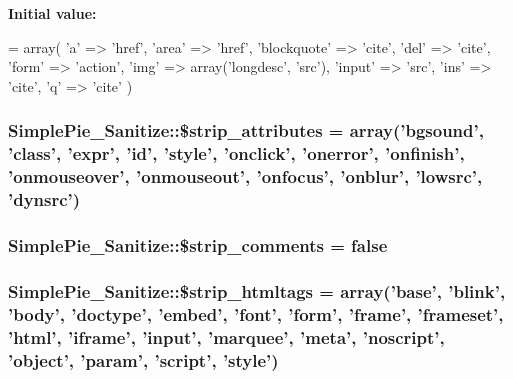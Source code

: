 {\bfseries Initial value\-:}
\begin{DoxyCode}
= array(
        \textcolor{charliteral}{'a'} => \textcolor{stringliteral}{'href'},
        \textcolor{stringliteral}{'area'} => \textcolor{stringliteral}{'href'},
        \textcolor{stringliteral}{'blockquote'} => \textcolor{stringliteral}{'cite'},
        \textcolor{stringliteral}{'del'} => \textcolor{stringliteral}{'cite'},
        \textcolor{stringliteral}{'form'} => \textcolor{stringliteral}{'action'},
        \textcolor{stringliteral}{'img'} => array(\textcolor{stringliteral}{'longdesc'}, \textcolor{stringliteral}{'src'}),
        \textcolor{stringliteral}{'input'} => \textcolor{stringliteral}{'src'},
        \textcolor{stringliteral}{'ins'} => \textcolor{stringliteral}{'cite'},
        \textcolor{charliteral}{'q'} => \textcolor{stringliteral}{'cite'}
    )
\end{DoxyCode}
\hypertarget{class_simple_pie___sanitize_aae7867d2da9eb4e606825088dafa74c3}{
\subsubsection[{\$strip\-\_\-attributes}]{\setlength{\rightskip}{0pt plus 5cm}Simple\-Pie\-\_\-\-Sanitize\-::\$strip\-\_\-attributes = array('bgsound', 'class', 'expr', 'id', 'style', 'onclick', 'onerror', 'onfinish', 'onmouseover', 'onmouseout', 'onfocus', 'onblur', 'lowsrc', 'dynsrc')}}\label{class_simple_pie___sanitize_aae7867d2da9eb4e606825088dafa74c3}
\hypertarget{class_simple_pie___sanitize_a08b78049d62d7787d48a648c778d327a}{
\subsubsection[{\$strip\-\_\-comments}]{\setlength{\rightskip}{0pt plus 5cm}Simple\-Pie\-\_\-\-Sanitize\-::\$strip\-\_\-comments = false}}\label{class_simple_pie___sanitize_a08b78049d62d7787d48a648c778d327a}
\hypertarget{class_simple_pie___sanitize_a2e0616ce8550a880763b6bf34407cccd}{
\subsubsection[{\$strip\-\_\-htmltags}]{\setlength{\rightskip}{0pt plus 5cm}Simple\-Pie\-\_\-\-Sanitize\-::\$strip\-\_\-htmltags = array('base', 'blink', 'body', 'doctype', 'embed', 'font', 'form', 'frame', 'frameset', 'html', 'iframe', 'input', 'marquee', 'meta', 'noscript', 'object', 'param', 'script', 'style')}}\label{class_simple_pie___sanitize_a2e0616ce8550a880763b6bf34407cccd}
